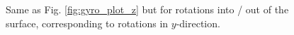 \documentclass[a4paper]{report}
\numberwithin{equation}{section}
\begin{document}
\begin{figure}[hbt!]
	\centering
	\quad

	\caption{Same as Fig. \ref{fig:gyro_plot_z} but for rotations into / out of the surface, corresponding to rotations in $y$-direction.}
	\label{fig:gyro_plot_y}
\end{figure}
\end{document}
